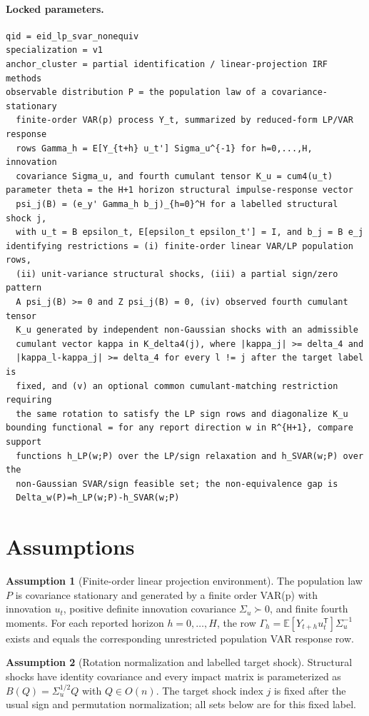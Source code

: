 \documentclass[11pt]{article}
\newcommand{\E}{\mathbb{E}}
\newcommand{\transpose}{\mathsf{T}}
\theoremstyle{definition}
\newtheorem{assumption}{Assumption}
\theoremstyle{plain}
\theoremstyle{remark}
\begin{document}
\paragraph{Locked parameters.}
\begin{verbatim}
qid = eid_lp_svar_nonequiv
specialization = v1
anchor_cluster = partial identification / linear-projection IRF methods
observable distribution P = the population law of a covariance-stationary
  finite-order VAR(p) process Y_t, summarized by reduced-form LP/VAR response
  rows Gamma_h = E[Y_{t+h} u_t'] Sigma_u^{-1} for h=0,...,H, innovation
  covariance Sigma_u, and fourth cumulant tensor K_u = cum4(u_t)
parameter theta = the H+1 horizon structural impulse-response vector
  psi_j(B) = (e_y' Gamma_h b_j)_{h=0}^H for a labelled structural shock j,
  with u_t = B epsilon_t, E[epsilon_t epsilon_t'] = I, and b_j = B e_j
identifying restrictions = (i) finite-order linear VAR/LP population rows,
  (ii) unit-variance structural shocks, (iii) a partial sign/zero pattern
  A psi_j(B) >= 0 and Z psi_j(B) = 0, (iv) observed fourth cumulant tensor
  K_u generated by independent non-Gaussian shocks with an admissible
  cumulant vector kappa in K_delta4(j), where |kappa_j| >= delta_4 and
  |kappa_l-kappa_j| >= delta_4 for every l != j after the target label is
  fixed, and (v) an optional common cumulant-matching restriction requiring
  the same rotation to satisfy the LP sign rows and diagonalize K_u
bounding functional = for any report direction w in R^{H+1}, compare support
  functions h_LP(w;P) over the LP/sign relaxation and h_SVAR(w;P) over the
  non-Gaussian SVAR/sign feasible set; the non-equivalence gap is
  Delta_w(P)=h_LP(w;P)-h_SVAR(w;P)
\end{verbatim}

\section{Assumptions}
\begin{assumption}[Finite-order linear projection environment]\label{ass:finite-var}
The population law \(P\) is covariance stationary and generated by a finite
order VAR(p) with innovation \(u_t\), positive definite innovation covariance
\(\Sigma_u\succ0\), and finite fourth moments.  For each reported horizon
\(h=0,\ldots,H\), the row \(\Gamma_h=\E[Y_{t+h}u_t^\transpose]\Sigma_u^{-1}\)
exists and equals the corresponding unrestricted population VAR response row.
\end{assumption}

\begin{assumption}[Rotation normalization and labelled target shock]\label{ass:normalization}
Structural shocks have identity covariance and every impact matrix is
parameterized as \(B(Q)=\Sigma_u^{1/2}Q\) with \(Q\in O(n)\).  The target shock
index \(j\) is fixed after the usual sign and permutation normalization; all
sets below are for this fixed label.
\end{assumption}
\end{document}
